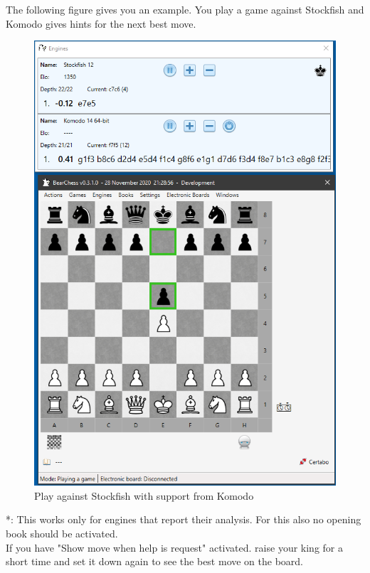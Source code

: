 \documentclass[11pt,a4paper]{article}
\begin{document}
The following figure gives you an example. You play a game against Stockfish and Komodo gives hints for the next best move. 

\begin{figure}[H]
	\centering
	\includegraphics[scale=0.7]{Extended1.png}
	\caption{Play against Stockfish with support from Komodo}
	\label{fig:Extended1}
\end{figure}

{\color{red}*}: This works only for engines that report their analysis. For this also no opening book should be activated.\\

If you have "Show move when help is request" activated. raise your king for a short time and set it down again to see the best move on the board.\\
\end{document}
